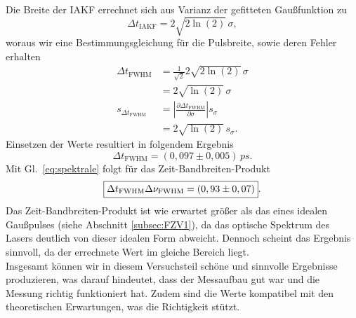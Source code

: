 Die Breite der IAKF errechnet sich aus Varianz der gefitteten Gaußfunktion zu
\begin{equation}
    \Delta t_{\text{IAKF}} = 2\sqrt{2\ln(2)}\,\sigma,
\end{equation}
woraus wir eine Bestimmungsgleichung für die Pulsbreite, sowie deren Fehler erhalten
\begin{align}
    \Delta t_{\text{FWHM}} &= \frac{1}{\sqrt{2}}2\sqrt{2\ln(2)}\,\sigma \\
    &= 2\sqrt{\ln(2)}\,\sigma \\
    s_{\Delta t_{\text{FWHM}}} &= \left\vert\frac{\partial \Delta t_{\text{FWHM}}}{\partial \sigma}\right\vert s_{\sigma} \\
    &= 2\sqrt{\ln(2)}\,s_{\sigma}.
\end{align}
Einsetzen der Werte resultiert in folgendem Ergebnis
\begin{equation}
    \Delta t_{\text{FWHM}} = (0,097 \pm 0,005)\,\si{ps}.
\end{equation}
Mit Gl.~\eqref{eq:spektrale} folgt für das Zeit-Bandbreiten-Produkt
\begin{equation}
    \fbox{$\Delta t_{\text{FWHM}}\Delta \nu_{\text{FWHM}} = (0,93 \pm 0,07)$}.
\end{equation}
Das Zeit-Bandbreiten-Produkt ist wie erwartet größer als das eines idealen Gaußpulses (siehe Abschnitt \ref{subsec:FZV1}),
da das optische Spektrum des Lasers deutlich von dieser idealen Form abweicht. Dennoch scheint das Ergebnis sinnvoll, da 
der errechnete Wert im gleiche Bereich liegt. \\
Insgesamt können wir in diesem Versuchsteil schöne und sinnvolle Ergebnisse produzieren, was darauf hindeutet, dass der 
Messaufbau gut war und die Messung richtig funktioniert hat. Zudem sind die Werte kompatibel mit den theoretischen 
Erwartungen, was die Richtigkeit stützt. \\
